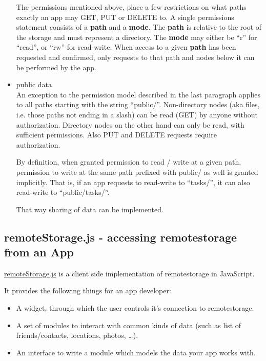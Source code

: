 \documentclass[11pt]{article}
\begin{document}
\begin{itemize}
     The permissions mentioned above, place a few restrictions on what paths exactly an app may GET, PUT or DELETE to.
     A single permissions statement consists of a \textbf{path} and a \textbf{mode}. The \textbf{path} is relative to the root of the storage and must represent a directory. The \textbf{mode} may either be ``r'' for ``read'', or ``rw'' for read-write.
     When access to a given \textbf{path} has been requested and confirmed, only requests to that path and nodes below it can be performed by the app.


\item public data\\
\label{sec-1-3-2-4}%
An exception to the permission model described in the last paragraph applies to all paths starting with the string ``public/''.
     Non-directory nodes (aka files, i.e. those paths not ending in a slash) can be read (GET) by anyone without authorization.
     Directory nodes on the other hand can only be read, with sufficient permissions. Also PUT and DELETE requests require authorization.

     By definition, when granted permission to read / write at a given path, permission to write at the same path prefixed with public/ as well is granted implicitly.
     That is, if an app requests to read-write to ``tasks/'', it can also read-write to ``public/tasks/''.

     That way sharing of data can be implemented.
     
\end{itemize} %
\subsection{remoteStorage.js - accessing remotestorage from an App}
\label{sec-1-4}


   \href{https://github.com/RemoteStorage/remoteStorage.js}{remoteStorage.js} is a client side implementation of remotestorage in JavaScript.

   It provides the following things for an app developer:

\begin{itemize}
\item A widget, through which the user controls it's connection to remotestorage.
\item A set of modules to interact with common kinds of data (such as list of friends/contacts, locations, photos, \ldots{}).
\item An interface to write a module which models the data your app works with.
\end{itemize}
\end{document}
